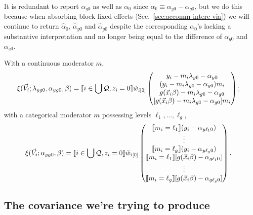 \documentclass{article}
\DeclarePairedDelimiter{\indicator}{\llbracket}{\rrbracket}
\newcommand{\owt}[1][{[z_{i}]}]{\ensuremath{\check{w}_{i#1}}}
\begin{document}
It is redundant to report $\alpha_{g0}$ as well as $\alpha_{0}$ since $\alpha_{0} \equiv \alpha_{y0} - \alpha_{g0}$, but we do this because when absorbing block fixed effects (Sec.~\ref{sec:accomm-interc-via}) we will continue to return $\hat{\alpha}_{0}$, $\hat{\alpha}_{y0}$ and $\hat{\alpha}_{g0}$ despite the corresponding $\alpha_{0}$'s lacking a substantive interpretation and no longer being equal to the difference of ${\alpha}_{y0}$ and ${\alpha}_{g0}$.

With a continuous moderator $m$,
\begin{equation}
\label{eq:37}
    \xi(\vec{V}_i; \lambda_{yg0}, \alpha_{yg0}, \beta) =
  \indicator{i \in \bigcup \mathcal{Q}, z_{i}=0}\owt[{[0]}]
  \begin{pmatrix}
    y_{i}-m_{i}\lambda_{y0} - \alpha_{y0}\\
    (y_{i}-m_{i}\lambda_{y0} - \alpha_{y0})m_i\\    
    g(\vec{x}_{i}\beta) - m_{i}\lambda_{g0}- \alpha_{g0}\\
    [g(\vec{x}_{i}\beta) - m_{i}\lambda_{g0}- \alpha_{g0}]m_{i}\\
  \end{pmatrix};
\end{equation}
with a categorical moderator $m$ possessing levels $\ell_{1}, \ldots,
\ell_{g}$,
\begin{equation}
  \label{eq:36}
    \xi(\vec{V}_i; \alpha_{yg0},  \beta) =
  \indicator{i \in \bigcup \mathcal{Q}, z_{i}=0}\owt[{[0]}]
  \begin{pmatrix}
    \indicator{ m_{i}=\ell_{1}}(y_{i}-\alpha_{y\ell_{1}0})\\
    \vdots\\
    \indicator{ m_{i}=\ell_{g}}(y_{i}-\alpha_{y\ell_{g}0})\\
    \indicator{ m_{i}=\ell_{1}}[g(\vec{x}_{i}\beta) -
    \alpha_{g\ell_{1}0}]\\
    \vdots\\
    \indicator{ m_{i}=\ell_{g}}[g(\vec{x}_{i}\beta) -    
    \alpha_{g\ell_{g}0}]\\  \end{pmatrix}.
\end{equation}

\subsection{The covariance we're trying to
  produce}\label{sec:covar-were-trying}
\end{document}
